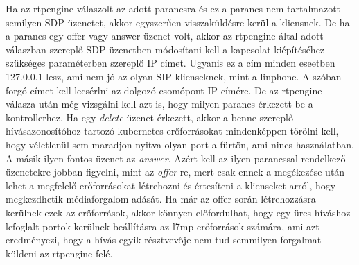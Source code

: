 Ha az rtpengine válaszolt az adott parancsra és ez a parancs nem tartalmazott semilyen 
SDP üzenetet, akkor egyszerűen visszaküldésre kerül a kliensnek. De ha a parancs egy offer
vagy answer üzenet volt, akkor az rtpengine által adott válaszban szereplő SDP üzenetben
módosítani kell a kapcsolat kiépítéséhez szükséges paraméterben szereplő IP címet. Ugyanis
ez a cím minden eseetben 127.0.0.1 lesz, ami nem jó az olyan SIP klienseknek, mint a linphone.
A szóban forgó címet kell lecsérlni az dolgozó csomópont IP címére. De az rtpengine 
válasza után még vizsgálni kell azt is, hogy milyen parancs érkezett be a kontrollerhez. 
Ha egy \textit{delete} üzenet érkezett, akkor a benne szereplő hívásazonosítóhoz tartozó
kubernetes erőforrásokat mindenképpen törölni kell, hogy véletlenül sem maradjon nyitva
olyan port a fürtön, ami nincs használatban. A másik ilyen fontos üzenet az \textit{answer}.
Azért kell az ilyen parancssal rendelkező üzenetekre jobban figyelni, mint az \textit{offer}-re,
mert csak ennek a megékezése után lehet a megfelelő erőforrásokat létrehozni és értesíteni
a klienseket arról, hogy megkezdhetik médiaforgalom adását. Ha már az offer során 
létrehozzásra kerülnek ezek az erőforrások, akkor könnyen előfordulhat, hogy egy üres híváshoz
lefoglalt portok kerülnek beállításra az l7mp erőforrások számára, ami azt eredményezi, hogy
a hívás egyik résztvevője nem tud semmilyen forgalmat küldeni az rtpengine felé.